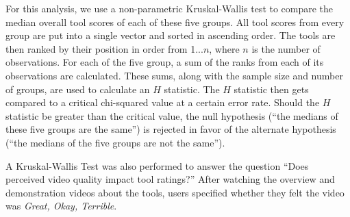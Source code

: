 For this analysis, we use a non-parametric Kruskal-Wallis test to compare the median overall tool scores of each of these five groups. All tool scores from every group are put into a single vector and sorted in ascending order. The tools are then ranked by their position in order from 1...$n$, where $n$ is the number of observations. For each of the five group, a sum of the ranks from each of its observations are calculated. These sums, along with the sample size and number of groups, are used to calculate an $H$ statistic. The $H$ statistic then gets compared to a critical chi-squared value at a certain error rate. Should the $H$ statistic be greater than the critical value, the null hypothesis (``the medians of these five groups are the same'') is rejected in favor of the alternate hypothesis (``the medians of the five groups are not the same'').

A Kruskal-Wallis Test was also performed to answer the question ``Does perceived video quality impact tool ratings?'' After watching the overview and demonstration videos about the tools, users specified whether they felt the video was \textit{Great, Okay, Terrible}. 

